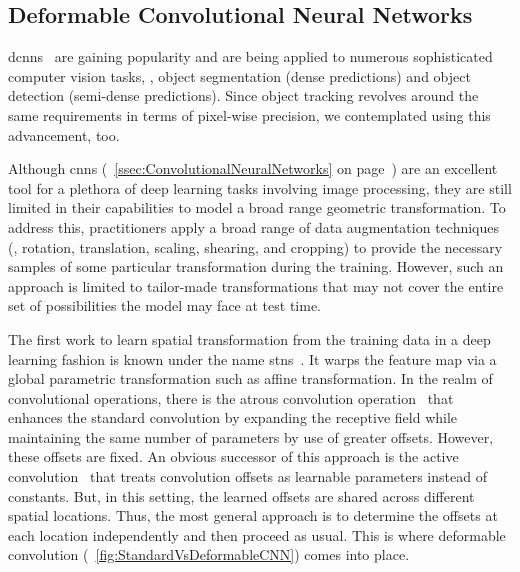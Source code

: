 \subsection{Deformable Convolutional Neural Networks}
\label{ssec:DeformableCNNs}

\Glspl{dcnn}~\cite{dai2017dcnn} are gaining popularity and are being applied to numerous sophisticated computer vision tasks, \egtext{}, object segmentation (dense predictions) and object detection (semi-dense predictions). Since object tracking revolves around the same requirements in terms of pixel-wise precision, we contemplated using this advancement, too.

Although \glspl{cnn} (\sectiontext{}~\ref{ssec:ConvolutionalNeuralNetworks} on page~\pageref{ssec:ConvolutionalNeuralNetworks}) are an excellent tool for a plethora of deep learning tasks involving image processing, they are still limited in their capabilities to model a broad range geometric transformation. To address this, practitioners apply a broad range of data augmentation techniques (\egtext{}, rotation, translation, scaling, shearing, and cropping) to provide the necessary samples of some particular transformation during the training. However, such an approach is limited to tailor-made transformations that may not cover the entire set of possibilities the model may face at test time.

The first work to learn spatial transformation from the training data in a deep learning fashion is known under the name \glspl{stn}~\cite{jaderberg2016stn}. It warps the feature map via a global parametric transformation such as affine transformation. In the realm of convolutional operations, there is the atrous convolution operation~\cite{holschneider1990atrousconv} that enhances the standard convolution by expanding the receptive field while maintaining the same number of parameters by use of greater offsets. However, these offsets are fixed. An obvious successor of this approach is the active convolution~\cite{jeon2017activeconv} that treats convolution offsets as learnable parameters instead of constants. But, in this setting, the learned offsets are shared across different spatial locations. Thus, the most general approach is to determine the offsets at each location independently and then proceed as usual. This is where deformable convolution (\figtext{}~\ref{fig:StandardVsDeformableCNN}) comes into place.

